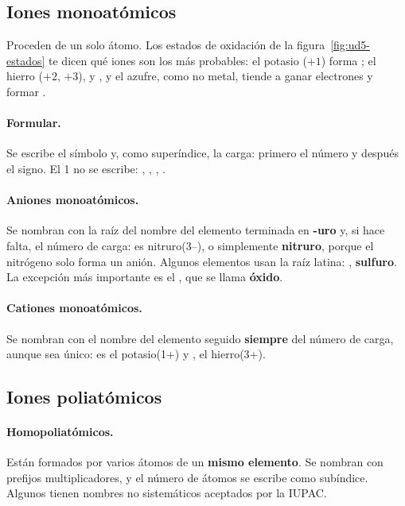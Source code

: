 \subsection{Iones monoatómicos}

Proceden de un solo átomo. Los estados de oxidación de la figura~\ref{fig:ud5-estados} te dicen qué iones son los más probables:
el potasio (\(+1\)) forma ; el hierro (\(+2\), \(+3\)),  y , y el azufre, como no metal, tiende a
ganar electrones y formar .

\paragraph{Formular.} Se escribe el símbolo y, como superíndice, la carga: primero el número y después el signo. El 1 no se
escribe: , , , .

\paragraph{Aniones monoatómicos.} Se nombran con la raíz del nombre del elemento terminada en \textbf{-uro} y, si hace falta, el
número de carga:  es nitruro(3\nobreakdash--), o simplemente \textbf{nitruro}, porque el nitrógeno solo forma un anión. Algunos
elementos usan la raíz latina: , \textbf{sulfuro}. La excepción más importante es el , que se llama
\textbf{óxido}.

\paragraph{Cationes monoatómicos.} Se nombran con el nombre del elemento seguido \textbf{siempre} del número de carga, aunque
sea único:  es el potasio(1+) y , el hierro(3+).

\subsection{Iones poliatómicos}

\paragraph{Homopoliatómicos.} Están formados por varios átomos de un \textbf{mismo elemento}. Se nombran con prefijos
multiplicadores, y el número de átomos se escribe como subíndice. Algunos tienen nombres no sistemáticos aceptados por la IUPAC.

